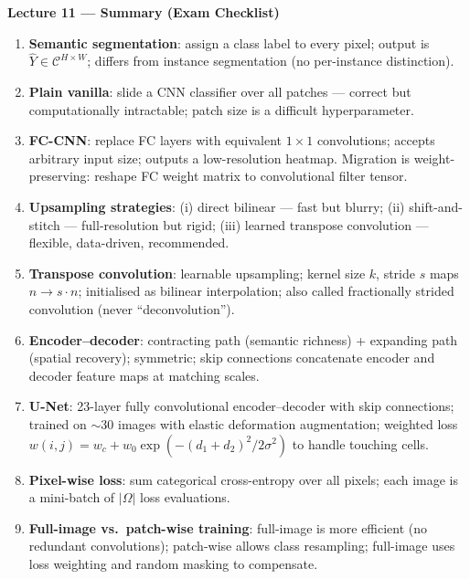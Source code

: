 \documentclass[11pt,a4paper]{article}
\begin{document}
\begin{tcolorbox}[colback=WarningRedBg,colframe=WarningRed,boxrule=0.8pt,arc=3pt]
\textbf{Lecture 11 — Summary (Exam Checklist)}
\begin{enumerate}
  \item \textbf{Semantic segmentation}: assign a class label to every pixel; output is $\hat{Y} \in \mathcal{C}^{H\times W}$; differs from instance segmentation (no per-instance distinction).
  \item \textbf{Plain vanilla}: slide a CNN classifier over all patches — correct but computationally intractable; patch size is a difficult hyperparameter.
  \item \textbf{FC-CNN}: replace FC layers with equivalent $1\times1$ convolutions; accepts arbitrary input size; outputs a low-resolution heatmap. Migration is weight-preserving: reshape FC weight matrix to convolutional filter tensor.
  \item \textbf{Upsampling strategies}: (i) direct bilinear — fast but blurry; (ii) shift-and-stitch — full-resolution but rigid; (iii) learned transpose convolution — flexible, data-driven, recommended.
  \item \textbf{Transpose convolution}: learnable upsampling; kernel size $k$, stride $s$ maps $n \to s\cdot n$; initialised as bilinear interpolation; also called fractionally strided convolution (never ``deconvolution'').
  \item \textbf{Encoder--decoder}: contracting path (semantic richness) + expanding path (spatial recovery); symmetric; skip connections concatenate encoder and decoder feature maps at matching scales.
  \item \textbf{U-Net}: 23-layer fully convolutional encoder--decoder with skip connections; trained on $\sim$30 images with elastic deformation augmentation; weighted loss $w(i,j) = w_c + w_0\exp(-(d_1+d_2)^2/2\sigma^2)$ to handle touching cells.
  \item \textbf{Pixel-wise loss}: sum categorical cross-entropy over all pixels; each image is a mini-batch of $|\Omega|$ loss evaluations.
  \item \textbf{Full-image vs.\ patch-wise training}: full-image is more efficient (no redundant convolutions); patch-wise allows class resampling; full-image uses loss weighting and random masking to compensate.
\end{enumerate}
\end{tcolorbox}


\end{document}
